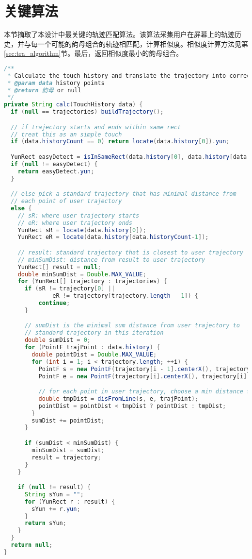 \chapter{关键算法\label{sec:code}}

本节摘取了本设计中最关键的轨迹匹配算法。该算法采集用户在屏幕上的轨迹历史，并与每一个可能的韵母组合的轨迹相匹配，计算相似度。相似度计算方法见第\ref{sec:tra_algorithm}节。最后，返回相似度最小的韵母组合。

\begin{lstlisting}[language=Java]
/**
 * Calculate the touch history and translate the trajectory into correct 韵母
 * @param data history points
 * @return 韵母 or null
 */
private String calc(TouchHistory data) {
  if (null == trajectories) buildTrajectory();

  // if trajectory starts and ends within same rect
  // treat this as an simple touch
  if (data.historyCount == 0) return locate(data.history[0]).yun;

  YunRect easyDetect = isInSameRect(data.history[0], data.history[data.historyCount-1]);
  if (null != easyDetect) {
    return easyDetect.yun;
  }

  // else pick a standard trajectory that has minimal distance from
  // each point of user trajectory
  else {
    // sR: where user trajectory starts
    // eR: where user trajectory ends
    YunRect sR = locate(data.history[0]);
    YunRect eR = locate(data.history[data.historyCount-1]);

    // result: standard trajectory that is closest to user trajectory
    // minSumDist: distance from result to user trajectory
    YunRect[] result = null;
    double minSumDist = Double.MAX_VALUE;
    for (YunRect[] trajectory : trajectories) {
      if (sR != trajectory[0] ||
              eR != trajectory[trajectory.length - 1]) {
          continue;
      }

      // sumDist is the minimal sum distance from user trajectory to
      // standard trajectory in this iteration
      double sumDist = 0;
      for (PointF trajPoint : data.history) {
        double pointDist = Double.MAX_VALUE;
        for (int i = 1; i < trajectory.length; ++i) {
          PointF s = new PointF(trajectory[i - 1].centerX(), trajectory[i - 1].centerY());
          PointF e = new PointF(trajectory[i].centerX(), trajectory[i].centerY());

          // for each point in user trajectory, choose a min distance from standard trajectories.
          double tmpDist = disFromLine(s, e, trajPoint);
          pointDist = pointDist < tmpDist ? pointDist : tmpDist;
        }
        sumDist += pointDist;
      }

      if (sumDist < minSumDist) {
        minSumDist = sumDist;
        result = trajectory;
      }
    }

    if (null != result) {
      String sYun = "";
      for (YunRect r : result) {
        sYun += r.yun;
      }
      return sYun;
    }
  }
  return null;
}
\end{lstlisting}
